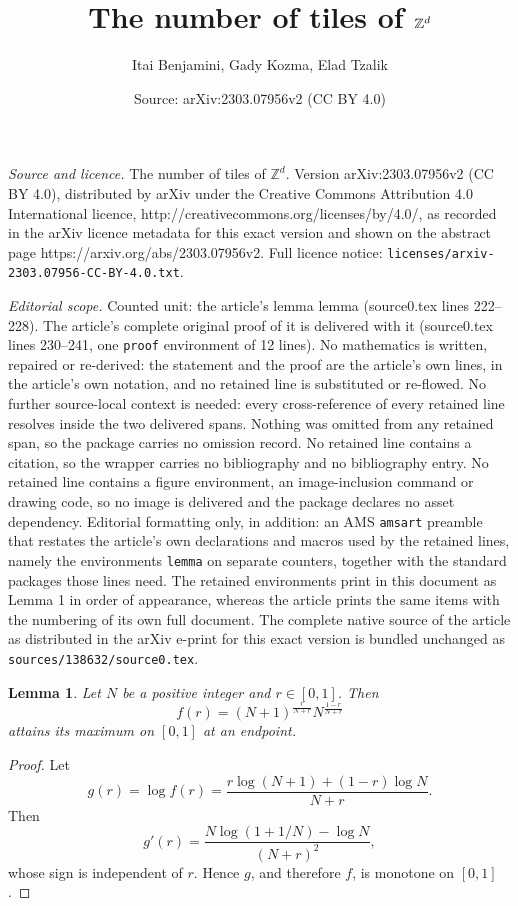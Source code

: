 \documentclass[10pt,a4paper]{amsart}
\title{The number of tiles of $\Z^d$}
\author{Itai Benjamini, Gady Kozma, Elad Tzalik}
\date{Source: arXiv:2303.07956v2 (CC BY 4.0)}
\newcommand{\Z}{\mathbb{Z}}
\newtheorem{lemma}{Lemma}
\begin{document}
\maketitle

\noindent\emph{Source and licence.} The number of tiles of $\Z^d$. Version arXiv:2303.07956v2 (CC BY 4.0), distributed by arXiv under the Creative Commons Attribution 4.0 International licence, http://creativecommons.org/licenses/by/4.0/, as recorded in the arXiv licence metadata for this exact version and shown on the abstract page https://arxiv.org/abs/2303.07956v2. Full licence notice: \texttt{licenses/arxiv-2303.07956-CC-BY-4.0.txt}.\par\smallskip

\noindent\textit{Editorial scope.} Counted unit: the article's lemma lemma (source0.tex lines 222--228). The article's complete original proof of it is delivered with it (source0.tex lines 230--241, one \texttt{proof} environment of 12 lines). No mathematics is written, repaired or re-derived: the statement and the proof are the article's own lines, in the article's own notation, and no retained line is substituted or re-flowed.  No further source-local context is needed: every cross-reference of every retained line resolves inside the two delivered spans.  Nothing was omitted from any retained span, so the package carries no omission record.  No retained line contains a citation, so the wrapper carries no bibliography and no bibliography entry.  No retained line contains a figure environment, an image-inclusion command or drawing code, so no image is delivered and the package declares no asset dependency.  Editorial formatting only, in addition: an AMS \texttt{amsart} preamble that restates the article's own declarations and macros used by the retained lines, namely the environments \texttt{lemma} on separate counters, together with the standard packages those lines need.  The retained environments print in this document as Lemma 1 in order of appearance, whereas the article prints the same items with the numbering of its own full document.  The complete native source of the article as distributed in the arXiv e-print for this exact version is bundled unchanged as \texttt{sources/138632/source0.tex}.
\begin{lemma}
    Let $N$ be a positive integer and $r \in [0,1]$. Then
    \[
        f(r)=(N+1)^{\frac{r}{N+r}}N^{\frac{1-r}{N+r}}
    \]
    attains its maximum on \([0,1]\) at an endpoint.
\end{lemma}

\begin{proof}
    Let
    \[
        g(r)=\log f(r)
        =\frac{r\log(N+1)+(1-r)\log N}{N+r}.
    \]
    Then
    \[
        g'(r)=\frac{N\log(1+1/N)-\log N}{(N+r)^2},
    \]
    whose sign is independent of \(r\). Hence \(g\), and therefore \(f\), is monotone on \([0,1]\).
\end{proof}
\end{document}
